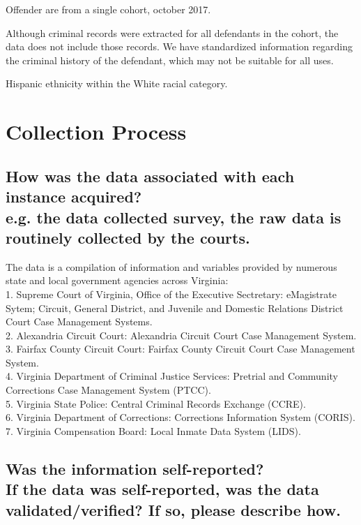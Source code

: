\documentclass[letterpaper, 10 pt, conference]{ieeeconf}  %
\newcommand{\subtitle}[1]{{\\ \small \normalfont \color{purple} #1}}
\begin{document}
Offender are from a single cohort, october 2017. 


Although criminal records were extracted for all defendants in the cohort, the data does not include those records. We have standardized information regarding the criminal history of the defendant, which may not be suitable for all uses.  


Hispanic ethnicity within the White racial category.


\section{Collection Process}

\subsection{How was the data associated with each instance acquired? \subtitle {e.g. the data collected survey, the raw data is routinely collected by the courts.}}

The data is a compilation of information and
variables provided by numerous state and local government agencies across Virginia: \\

1. Supreme Court of Virginia, Office of the Executive Sectretary: eMagistrate Sytem; Circuit, General District, and Juvenile and Domestic Relations District Court Case Management
Systems. \\
2. Alexandria Circuit Court: Alexandria Circuit Court Case Management System. \\
3. Fairfax County Circuit Court: Fairfax County Circuit Court Case Management System. \\
4. Virginia Department of Criminal Justice Services: Pretrial and Community Corrections Case Management System (PTCC). \\
5. Virginia State Police: Central Criminal Records Exchange (CCRE). \\
6. Virginia Department of Corrections: Corrections Information System (CORIS). \\
7. Virginia Compensation Board: Local Inmate Data System (LIDS). \\

\subsection{Was the information self-reported? \subtitle{If the data was self-reported, was the data validated/verified? If so, please describe how.}}
\end{document}
